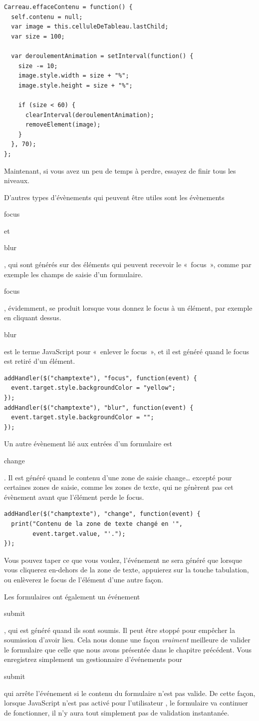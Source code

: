 \documentclass{FramateX}
\renewcommand{\texttt}[1]{\begin{sffamily}{#1}\end{sffamily}}
\begin{document}
\begin{lstlisting}
Carreau.effaceContenu = function() {
  self.contenu = null;
  var image = this.celluleDeTableau.lastChild;
  var size = 100;

  var deroulementAnimation = setInterval(function() {
    size -= 10;
    image.style.width = size + "%";
    image.style.height = size + "%";

    if (size < 60) {
      clearInterval(deroulementAnimation);
      removeElement(image);
    }
  }, 70);
};
\end{lstlisting}
Maintenant, si vous avez un peu de temps à perdre, essayez de finir tous
les niveaux.

\begin{center}\end{center}

D'autres types d'évènements qui peuvent être utiles sont les évènements
\texttt{focus} et \texttt{blur}, qui sont générés sur des éléments qui
peuvent recevoir le «~focus~», comme par exemple les champs de saisie
d'un formulaire. \texttt{focus}, évidemment, se produit lorsque vous
donnez le focus à un élément, par exemple en cliquant dessus.
\texttt{blur} est le terme JavaScript pour «~enlever le focus~», et il
est généré quand le focus est retiré d'un élément.

\begin{lstlisting}
addHandler($("champtexte"), "focus", function(event) {
  event.target.style.backgroundColor = "yellow";
});
addHandler($("champtexte"), "blur", function(event) {
  event.target.style.backgroundColor = "";
});
\end{lstlisting}
Un autre évènement lié aux entrées d'un formulaire est \texttt{change}.
Il est généré quand le contenu d'une zone de saisie change\ldots{}
excepté pour certaines zones de saisie, comme les zones de texte, qui ne
génèrent pas cet évènement avant que l'élément perde le focus.

\begin{lstlisting}
addHandler($("champtexte"), "change", function(event) {
  print("Contenu de la zone de texte changé en '",
        event.target.value, "'.");
});
\end{lstlisting}
Vous pouvez taper ce que vous voulez, l'événement ne sera généré que
lorsque vous cliquerez en-dehors de la zone de texte, appuierez sur la
touche tabulation, ou enlèverez le focus de l'élément d'une autre façon.

Les formulaires ont également un événement \texttt{submit} , qui est
généré quand ils sont soumis. Il peut être stoppé pour empêcher la
soumission d'avoir lieu. Cela nous donne une façon \emph{vraiment}
meilleure de valider le formulaire que celle que nous avons présentée
dans le chapitre précédent. Vous enregistrez simplement un gestionnaire
d'événements pour \texttt{submit} qui arrête l'événement si le contenu
du formulaire n'est pas valide. De cette façon, lorsque JavaScript n'est
pas activé pour l'utilisateur , le formulaire va continuer de
fonctionner, il n'y aura tout simplement pas de validation instantanée.
\end{document}
